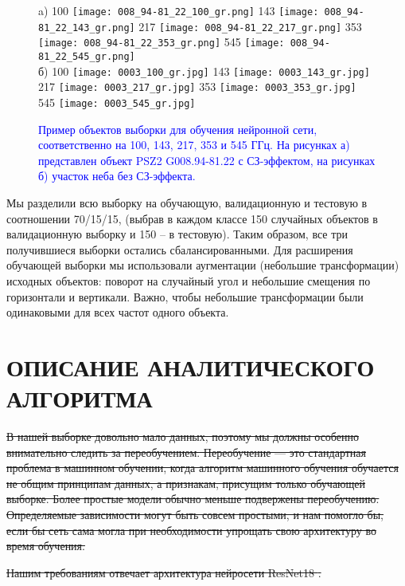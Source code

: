 \documentclass[
aps,%
12pt,%
final,%
notitlepage,%
oneside,%
onecolumn,%
nobibnotes,%
nofootinbib,%
superscriptaddress,%
noshowpacs,%
centertags]%
{revtex4}
\begin{document}
\begin{figure}
a) 100 \texttt{[image: 008\_94-81\_22\_100\_gr.png]}
143 \texttt{[image: 008\_94-81\_22\_143\_gr.png]}
217 \texttt{[image: 008\_94-81\_22\_217\_gr.png]}
353 \texttt{[image: 008\_94-81\_22\_353\_gr.png]}
545 \texttt{[image: 008\_94-81\_22\_545\_gr.png]}\\
б) 100 \texttt{[image: 0003\_100\_gr.jpg]}
143 \texttt{[image: 0003\_143\_gr.jpg]}
217 \texttt{[image: 0003\_217\_gr.jpg]}
353 \texttt{[image: 0003\_353\_gr.jpg]}
545 \texttt{[image: 0003\_545\_gr.jpg]}
\caption{\textcolor{blue} {Пример объектов выборки для обучения нейронной сети, соответственно на 100, 143, 217, 353 и 545 ГГц. На рисунках а) представлен объект PSZ2 G008.94-81.22 с СЗ-эффектом, на рисунках б) участок неба без СЗ-эффекта.}}
\label{fig:freq11}
\end{figure}


Мы разделили всю выборку на обучающую, валидационную и тестовую в соотношении 70/15/15, (выбрав в каждом классе 150 случайных объектов в валидационную выборку и 150 -- в тестовую). Таким образом, все три получившиеся выборки остались сбалансированными. Для расширения обучающей выборки мы использовали аугментации (небольшие трансформации)  исходных объектов: поворот на случайный угол и небольшие смещения по горизонтали и вертикали. Важно, чтобы небольшие трансформации были одинаковыми для всех частот одного объекта.

\section{ОПИСАНИЕ АНАЛИТИЧЕСКОГО АЛГОРИТМА}
\label{sec:algorithm}

\sout{В нашей выборке довольно мало данных, поэтому мы должны особенно внимательно следить за переобучением. Переобучение --- это стандартная проблема в машинном обучении, когда алгоритм машинного обучения обучается не общим принципам данных, а признакам, присущим только обучающей выборке. Более простые модели обычно меньше подвержены переобучению. Определяемые зависимости могут быть совсем простыми, и нам помогло бы, если бы сеть сама могла при необходимости упрощать свою архитектуру во время обучения.}

\sout{Нашим  требованиям отвечает архитектура нейросети ResNet18 \cite{resNET1}.}
\end{document}
